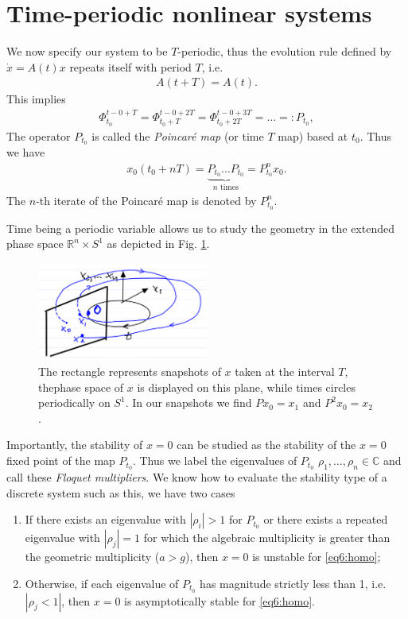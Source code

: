 \section{Time-periodic nonlinear systems}
We now specify our system to be $T$-periodic, thus the evolution rule defined by $\dot{x}=A(t)x$ repeats itself with period $T$, i.e.
\begin{align}
	A(t+T) = A(t).
\end{align}
This implies
\begin{align}
	\Phi_{t_0}^{t-0 +T} = 	\Phi_{t_0+T}^{t-0 +2T} =\Phi_{t_0+2T}^{t-0 +3T} =\ldots =: P_{t_0},  
\end{align}
The operator $P_{t_0}$ is called the \emph{Poincaré map} (or time $T$ map) based at $t_0$. Thus we have
\begin{align}
x_0(t_0+nT) = \underbrace{P_{t_0} \ldots P_{t_0}}_{n  \textrm{ times} } = P_{t_0}^{n}x_0.
\end{align}
The $n$-th iterate of the Poincaré map is denoted by $P_{t_0}^{n}$.

Time being a periodic variable allows us to study the geometry in the extended phase space $\mathbb{R}^{n}\times S^{1}$ as depicted in Fig. \ref{fig:poinc_geom}.
\begin{figure}[h!]
	\centering
	\includegraphics[width=0.5\textwidth]{figures/ch5/1poinc_geom.png}
	\caption{The rectangle represents snapshots of $x$ taken at the interval $T$, thephase space of $x$ is displayed on this plane, while times circles periodically on $S^{1}$. In our snapshots we find $Px_0 = x_1$ and $P^2x_0 = x_2$.}
	\label{fig:poinc_geom}
\end{figure}
Importantly, the stability of $x=0$ can be studied as the stability of the $x=0$ fixed point of the map $P_{t_0}$. Thus we label the eigenvalues of $P_{t_0}$ $\rho_1,\ldots,\rho_n\in\mathbb{C}$  and call these \emph{Floquet multipliers}. We know how to evaluate the stability type of a discrete system such as this, we have two cases
\begin{enumerate}
	\item If there exists an eigenvalue with $|\rho_i|>1$ for $P_{t_0}$ or there exists a repeated eigenvalue with $|\rho_j|=1$ for which the algebraic multiplicity is greater than the geometric multiplicity ($a>g$), then $x=0$ is unstable for \eqref{eq6:homo};
	\item Otherwise, if each eigenvalue of $P_{t_0}$ has magnitude strictly less than 1, i.e. $|\rho_j<1|$, then $x=0$ is asymptotically stable for \eqref{eq6:homo}.
\end{enumerate}

